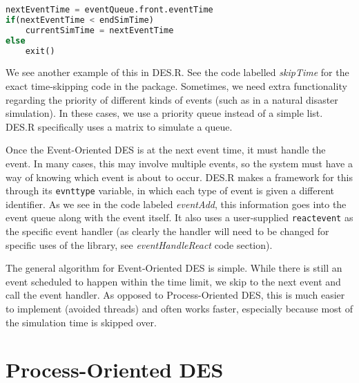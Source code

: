 \documentclass[a4paper, 11pt]{article} %
\begin{document}
\begin{lstlisting}[language=Python, label=SkipTimeAlgo, caption=Skip Time Algorithm]
nextEventTime = eventQueue.front.eventTime
if(nextEventTime < endSimTime)
	currentSimTime = nextEventTime
else
	exit()
\end{lstlisting}

We see another example of this in DES.R. See the code labelled \textit{skipTime} for the exact time-skipping code in the package. Sometimes, we need extra functionality regarding the priority of different kinds of events (such as in a natural disaster simulation). In these cases, we use a priority queue instead of a simple list. DES.R specifically uses a matrix to simulate a queue.

Once the Event-Oriented DES is at the next event time, it must handle the event. In many cases, this may involve multiple events, so the system must have a way of knowing which event is about to occur. DES.R makes a framework for this through its \texttt{evnttype} variable, in which each type of event is given a different identifier. As we see in the code labeled \textit{eventAdd}, this information goes into the event queue along with the event itself. It also uses a user-supplied \texttt{reactevent} as the specific event handler (as clearly the handler will need to be changed for specific uses of the library, see \textit{eventHandleReact} code section).

The general algorithm for Event-Oriented DES is simple. While there is still an event scheduled to happen within the time limit, we skip to the next event and call the event handler. As opposed to Process-Oriented DES, this is much easier to implement (avoided threads) and often works faster, especially because most of the simulation time is skipped over. \newline


\pagebreak


\section{Process-Oriented DES}

\end{document}
